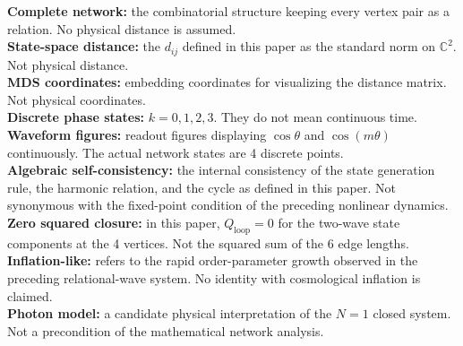 \documentclass[
  a4paper,
]{article}
\begin{document}
\textbf{Complete network:} the combinatorial structure keeping every
vertex pair as a relation. No physical distance is assumed.\\
\textbf{State-space distance:} the \(d_{ij}\) defined in this paper as
the standard norm on \(\mathbb C^2\). Not physical distance.\\
\textbf{MDS coordinates:} embedding coordinates for visualizing the
distance matrix. Not physical coordinates.\\
\textbf{Discrete phase states:} \(k=0,1,2,3\). They do not mean
continuous time.\\
\textbf{Waveform figures:} readout figures displaying \(\cos\theta\) and
\(\cos(m\theta)\) continuously. The actual network states are 4 discrete
points.\\
\textbf{Algebraic self-consistency:} the internal consistency of the
state generation rule, the harmonic relation, and the cycle as defined
in this paper. Not synonymous with the fixed-point condition of the
preceding nonlinear dynamics.\\
\textbf{Zero squared closure:} in this paper, \(Q_{\mathrm{loop}}=0\)
for the two-wave state components at the 4 vertices. Not the squared sum
of the 6 edge lengths.\\
\textbf{Inflation-like:} refers to the rapid order-parameter growth
observed in the preceding relational-wave system. No identity with
cosmological inflation is claimed.\\
\textbf{Photon model:} a candidate physical interpretation of the
\(N=1\) closed system. Not a precondition of the mathematical network
analysis.
\end{document}
